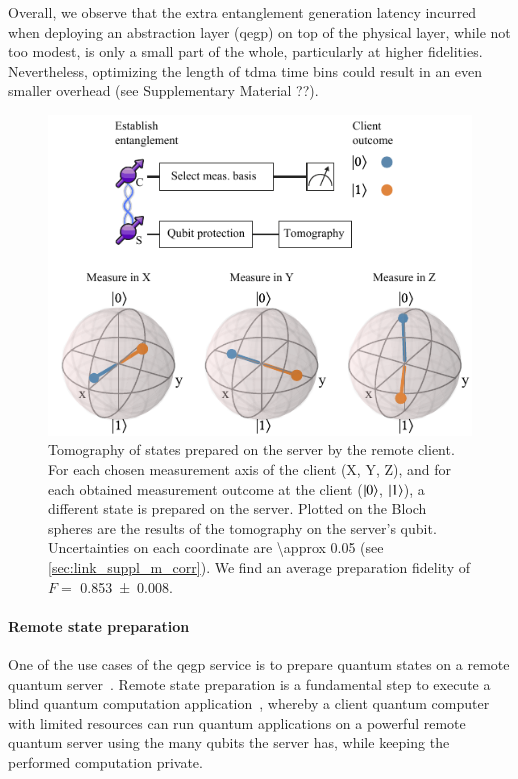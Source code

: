 Overall, we observe that the extra entanglement generation latency incurred when deploying an
abstraction layer (\acrshort{qegp}) on top of the physical layer, while not too modest, is only a
small part of the whole, particularly at higher fidelities. Nevertheless, optimizing the length of
\acrshort{tdma} time bins could result in an even smaller overhead (see Supplementary Material ??).

\begin{figure}
    \centering
    \includegraphics[width=0.6\linewidth]{figures/rsprep.pdf}
    \caption{
        Tomography of states prepared on the server by the remote client. For each chosen
        measurement axis of the client (X, Y, Z), and for each obtained measurement outcome at the
        client ($\ket{0}$, $\ket{1}$), a different state is prepared on the server. Plotted on the
        Bloch spheres are the results of the tomography on the server's qubit. Uncertainties on each
        coordinate are \num{\approx 0.05} (see \cref{sec:link_suppl_m_corr}). We find an average
        preparation fidelity of $F =$ \num{0.853(8)}.
    }
    \label{fig:rsprep}
\end{figure}

\paragraph{Remote state preparation}

One of the use cases of the \acrshort{qegp} service is to prepare quantum states on a remote quantum
server~\cite{dahlberg_2019_egp}. Remote state preparation is a fundamental step to execute a blind
quantum computation application~\cite{broadbent_2009_ubqc}, whereby a client quantum computer with
limited resources can run quantum applications on a powerful remote quantum server using the many
qubits the server has, while keeping the performed computation private.

